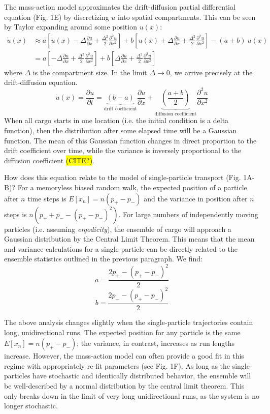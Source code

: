 \documentclass[11pt]{wlpeerj}
\begin{document}
The mass-action model approximates the drift-diffusion partial differential equation (Fig. 1E) by discretizing $u$ into spatial compartments. This can be seen by Taylor expanding around some position $u(x)$:
$$
\begin{align}
\dot{u}(x) &
\approx a\left[u(x) - \Delta \frac{\partial u}{\partial x} + \frac{\Delta^2}{2} \frac{\partial^2 u}{\partial x^2} \right] + b\left[u(x) + \Delta \frac{\partial u}{\partial x} + \frac{\Delta^2}{2} \frac{\partial^2 u}{\partial x^2} \right] - (a+b)~u(x) \\
 & = a\left[- \Delta \frac{\partial u}{\partial x} + \frac{\Delta^2}{2} \frac{\partial^2 u}{\partial x^2} \right] + b\left[\Delta \frac{\partial u}{\partial x} + \frac{\Delta^2}{2} \frac{\partial^2 u}{\partial x^2} \right]
\end{align}
$$
where $\Delta$ is the compartment size. In the limit $\Delta \rightarrow 0$, we arrive precisely at the drift-diffusion equation.
$$
\dot{u}(x) = \frac{\partial u}{\partial t} = \underbrace{(b-a)}_{\text{drift coefficient}} \frac{\partial u}{\partial x} + \underbrace{\left(\frac{a+b}{2}\right)}_{\text{diffusion coefficient}} \frac{\partial^2 u}{\partial x^2}
$$
When all cargo starts in one location (i.e. the initial condition is a delta function), then the distribution after some elapsed time will be a Gaussian function. The mean of this Gaussian function changes in direct proportion to the drift coefficient over time, while the variance is inversely proportional to the diffusion coefficient \hl{(CITE?)}.

How does this equation relate to the model of single-particle transport (Fig. 1A-B)? For a memoryless biased random walk, the expected position of a particle after $n$ time steps is $E[x_n] = n(p_+ - p_-)$ and the variance in position after $n$ steps is $n \left( p_+ + p_- - (p_+ - p_-)^2 \right)$. For large numbers of independently moving particles (i.e. assuming \textit{ergodicity}), the ensemble of cargo will approach a Gaussian distribution by the Central Limit Theorem. This means that the mean and variance calculations for a single particle can be directly related to the ensemble statistics outlined in the previous paragraph. We find:
$$
a = \frac{2p_+ - (p_+ - p_-)^2}{2}
$$
$$
b = \frac{2p_- - (p_+ - p_-)^2}{2}
$$

The above analysis changes slightly when the single-particle trajectories contain long, unidirectional runs. The expected position for any particle is the same $E[x_n] = n(p_+ - p_-)$; the variance, in contrast, increases as run lengths increase. However, the mass-action model can often provide a good fit in this regime with appropriately re-fit parameters (see Fig. 1F). As long as the single-particles have stochastic and identically distributed behavior, the ensemble will be well-described by a normal distribution by the central limit theorem. This only breaks down in the limit of very long unidirectional runs, as the system is no longer stochastic.
\end{document}
